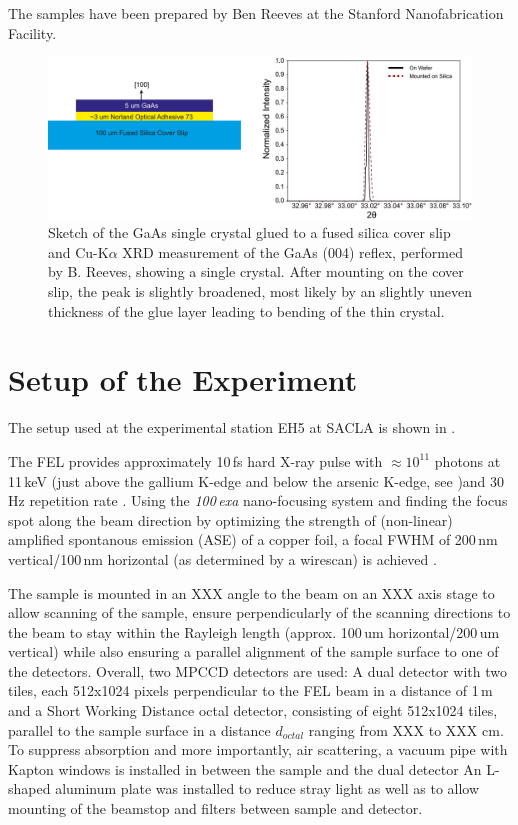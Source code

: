 The samples have been prepared by Ben Reeves at the Stanford Nanofabrication Facility. 

\begin{figure}[tp]
	\centering
	\includegraphics[width=0.8\linewidth]{images/gaas_sample.pdf}
	\caption[GaAs Sample]{Sketch of the GaAs single crystal glued to a fused silica cover slip and Cu-K$\alpha$ XRD measurement of the GaAs (004) reflex, performed by B. Reeves, showing a single crystal. After mounting on the cover slip, the peak is slightly broadened, most likely by an slightly uneven thickness of the glue layer  leading to bending of the thin crystal.}
	\label{fig:gaas_sample}
\end{figure}


\section{Setup of the Experiment}
The setup used at the experimental station EH5 at SACLA is shown in . 

The FEL provides approximately 10\,fs hard X-ray pulse with $\approx 10^11$ photons at 11\,keV (just above the gallium K-edge and below the arsenic K-edge, see )and 30\,Hz repetition rate \cite{tono2013}. Using the \textit{100\,exa} nano-focusing system and finding the focus spot along the beam direction by optimizing the strength of (non-linear) amplified spontanous emission (ASE) of a copper foil, a focal FWHM of 200\,nm vertical/100\,nm horizontal (as determined by a wirescan) is achieved \cite{yumoto2020,handa2010,yoneda2015}.


The sample is mounted in an XXX angle to the beam on an XXX axis stage to allow scanning of the sample, ensure perpendicularly of the scanning directions to the beam to stay within the Rayleigh length (approx. 100\,um horizontal/200\,um vertical) while also ensuring a parallel alignment of the sample surface to one of the detectors. Overall, two MPCCD detectors are used: A dual detector with two tiles, each 512x1024 pixels perpendicular to the FEL beam in a distance of 1\,m and a Short Working Distance octal detector, consisting of eight 512x1024 tiles, parallel to the sample surface in a distance $d_{octal}$ ranging from XXX to XXX cm. To suppress absorption and more importantly, air scattering, a vacuum pipe with Kapton windows is installed in between the sample and the dual detector
An L-shaped aluminum plate was installed to reduce stray light as well as to allow mounting of the beamstop and filters between sample and detector.

